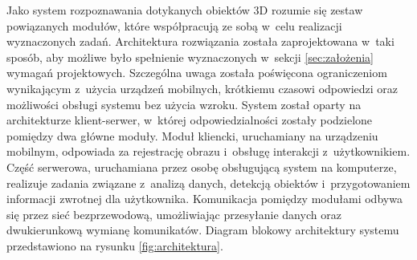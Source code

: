 Jako system rozpoznawania dotykanych obiektów 3D rozumie się zestaw powiązanych modułów, które współpracują ze sobą w~celu realizacji wyznaczonych zadań. Architektura rozwiązania została zaprojektowana w~taki sposób, aby możliwe było spełnienie wyznaczonych w~sekcji \ref{sec:założenia} wymagań projektowych. Szczególna uwaga została poświęcona ograniczeniom wynikającym z~użycia urządzeń mobilnych, krótkiemu czasowi odpowiedzi oraz możliwości obsługi systemu bez użycia wzroku. System został oparty na architekturze klient-serwer, w~której odpowiedzialności zostały podzielone pomiędzy dwa główne moduły. Moduł kliencki, uruchamiany na urządzeniu mobilnym, odpowiada za rejestrację obrazu i~obsługę interakcji z~użytkownikiem. Część serwerowa, uruchamiana przez osobę obsługującą system na komputerze, realizuje zadania związane z~analizą danych, detekcją obiektów i~przygotowaniem informacji zwrotnej dla użytkownika. Komunikacja pomiędzy modułami odbywa się przez sieć bezprzewodową, umożliwiając przesyłanie danych oraz dwukierunkową wymianę komunikatów. Diagram blokowy architektury systemu przedstawiono na rysunku \ref{fig:architektura}.

